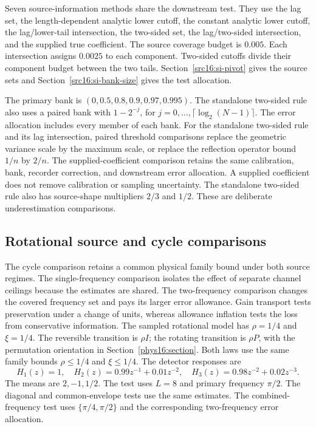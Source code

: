 Seven source-information methods share the downstream test. They use the lag set, the length-dependent analytic lower cutoff, the constant analytic lower cutoff, the lag/lower-tail intersection, the two-sided set, the lag/two-sided intersection, and the supplied true coefficient. The source coverage budget is $0.005$. Each intersection assigns $0.0025$ to each component. Two-sided cutoffs divide their component budget between the two tails. Section~\ref{src16:si-pivot} gives the source sets and Section~\ref{src16:si-bank-size} gives the test allocation.

The primary bank is $(0,0.5,0.8,0.9,0.97,0.995)$. The standalone two-sided rule also uses a paired bank with $1-2^{-j}$, for $j=0,\ldots,\lceil\log_2(N-1)\rceil$. The error allocation includes every member of each bank. For the standalone two-sided rule and its lag intersection, paired threshold comparisons replace the geometric variance scale by the maximum scale, or replace the reflection operator bound $1/n$ by $2/n$. The supplied-coefficient comparison retains the same calibration, bank, recorder correction, and downstream error allocation. A supplied coefficient does not remove calibration or sampling uncertainty. The standalone two-sided rule also has source-shape multipliers $2/3$ and $1/2$. These are deliberate underestimation comparisons.

\subsection{Rotational source and cycle comparisons}
The cycle comparison retains a common physical family bound under both source regimes. The single-frequency comparison isolates the effect of separate channel ceilings because the estimates are shared. The two-frequency comparison changes the covered frequency set and pays its larger error allowance. Gain transport tests preservation under a change of units, whereas allowance inflation tests the loss from conservative information.
The sampled rotational model has $\rho=1/4$ and $\xi=1/4$. The reversible transition is $\rho I$; the rotating transition is $\rho P$, with the permutation orientation in Section~\ref{phys16:section}. Both laws use the same family bounds $\rho\le1/4$ and $\xi\le1/4$. The detector responses are
\[
 H_1(z)=1,\quad H_2(z)=0.99z^{-1}+0.01z^{-2},\quad
 H_3(z)=0.98z^{-2}+0.02z^{-3}.
\]
The means are $2,-1,1/2$. The test uses $L=8$ and primary frequency $\pi/2$. The diagonal and common-envelope tests use the same estimates. The combined-frequency test uses $\{\pi/4,\pi/2\}$ and the corresponding two-frequency error allocation.

